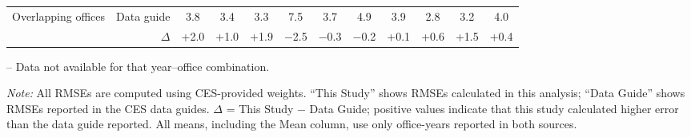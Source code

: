 \begin{table}[p]
{\begin{threeparttable}
\begin{tabular}{lrcccccccccc}
Overlapping offices & Data guide & 3.8 & 3.4 & 3.3 & 7.5 & 3.7 & 4.9 & 3.9 & 2.8 & 3.2 & 4.0 \\
 & $\Delta$ & +2.0 & +1.0 & +1.9 & $-$2.5 & $-$0.3 & $-$0.2 & +0.1 & +0.6 & +1.5 & +0.4 \\
\bottomrule
\end{tabular}
\begin{tablenotes}
\footnotesize
\item -- Data not available for that year--office combination.
\item \textit{Note:} All RMSEs are computed using CES-provided weights. ``This Study'' shows RMSEs calculated in this analysis; ``Data Guide'' shows RMSEs reported in the CES data guides. $\Delta$ = This Study $-$ Data Guide; positive values indicate that this study calculated higher error than the data guide reported. All means, including the Mean column, use only office-years reported in both sources.
\end{tablenotes}
\end{threeparttable}%
}
\end{table}